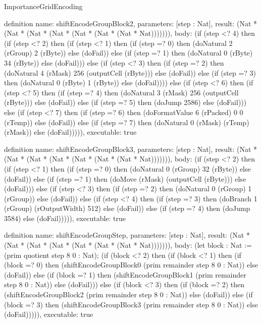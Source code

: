 \begin{lexlean}{ImportanceGridEncoding}
\begin{semanticmodule}
definition{
  name: shiftEncodeGroupBlock2,
  parameters: [step : Nat],
  result: (Nat * (Nat * (Nat * (Nat * (Nat * (Nat * (Nat * Nat))))))),
  body: (if (step <? 4) then
      (if (step <? 2) then
      (if (step <? 1) then
      (if (step =? 0) then (doNatural 2 (rGroup) 2 (rByte)) else (doFail)) else
      (if (step =? 1) then (doNatural 0 (rByte) 34 (rByte)) else (doFail))) else
      (if (step <? 3) then
      (if (step =? 2) then (doNatural 4 (rMask) 256 (outputCell (rByte))) else (doFail)) else
      (if (step =? 3) then (doNatural 0 (rByte) 1 (rByte)) else (doFail)))) else
      (if (step <? 6) then
      (if (step <? 5) then
      (if (step =? 4) then (doNatural 3 (rMask) 256 (outputCell (rByte))) else (doFail)) else
      (if (step =? 5) then (doJump 2586) else (doFail))) else
      (if (step <? 7) then
      (if (step =? 6) then (doFormatValue 6 (rPacked) 0 0 (rTemp)) else (doFail)) else
      (if (step =? 7) then (doNatural 0 (rMask) (rTemp) (rMask)) else (doFail))))),
  executable: true
}

definition{
  name: shiftEncodeGroupBlock3,
  parameters: [step : Nat],
  result: (Nat * (Nat * (Nat * (Nat * (Nat * (Nat * (Nat * Nat))))))),
  body: (if (step <? 2) then
      (if (step <? 1) then
      (if (step =? 0) then (doNatural 0 (rGroup) 32 (rByte)) else (doFail)) else
      (if (step =? 1) then (doMove (rMask) (outputCell (rByte))) else (doFail))) else
      (if (step <? 3) then
      (if (step =? 2) then (doNatural 0 (rGroup) 1 (rGroup)) else (doFail)) else
      (if (step <? 4) then
      (if (step =? 3) then (doBranch 1 (rGroup) (rOutputWidth) 512) else (doFail)) else
      (if (step =? 4) then (doJump 3584) else (doFail))))),
  executable: true
}

definition{
  name: shiftEncodeGroupStep,
  parameters: [step : Nat],
  result: (Nat * (Nat * (Nat * (Nat * (Nat * (Nat * (Nat * Nat))))))),
  body: (let block : Nat := (prim quotient step 8 0 : Nat); (if (block <? 2) then
      (if (block <? 1) then
      (if (block =? 0) then (shiftEncodeGroupBlock0 (prim remainder step 8 0 : Nat)) else (doFail)) else
      (if (block =? 1) then (shiftEncodeGroupBlock1 (prim remainder step 8 0 : Nat)) else (doFail))) else
      (if (block <? 3) then
      (if (block =? 2) then (shiftEncodeGroupBlock2 (prim remainder step 8 0 : Nat)) else (doFail)) else
      (if (block =? 3) then (shiftEncodeGroupBlock3 (prim remainder step 8 0 : Nat)) else (doFail))))),
  executable: true
}


\end{semanticmodule}
\end{lexlean}
